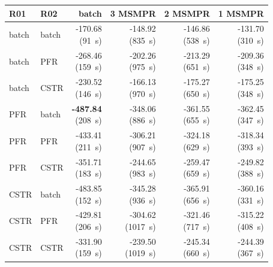 \begin{tabular}{@{}llrrrr@{}}\toprule
R01 & R02 & batch & 3 MSMPR & 2 MSMPR & 1 MSMPR\\\midrule
batch & batch & \makecell{-170.68\\(91~s)} & \makecell{-148.92\\(835~s)} & \makecell{-146.86\\(538~s)} & \makecell{-131.70\\(310~s)} \\
batch & PFR & \makecell{-268.46\\(159~s)} & \makecell{-202.26\\(975~s)} & \makecell{-213.29\\(651~s)} & \makecell{-209.36\\(348~s)} \\
batch & CSTR & \makecell{-230.52\\(146~s)} & \makecell{-166.13\\(970~s)} & \makecell{-175.27\\(650~s)} & \makecell{-175.25\\(348~s)} \\
PFR & batch & \makecell{\textbf{-487.84}\\(208~s)} & \makecell{-348.06\\(886~s)} & \makecell{-361.55\\(655~s)} & \makecell{-362.45\\(347~s)} \\
PFR & PFR & \makecell{-433.41\\(211~s)} & \makecell{-306.21\\(907~s)} & \makecell{-324.18\\(629~s)} & \makecell{-318.34\\(393~s)} \\
PFR & CSTR & \makecell{-351.71\\(183~s)} & \makecell{-244.65\\(983~s)} & \makecell{-259.47\\(659~s)} & \makecell{-249.82\\(388~s)} \\
CSTR & batch & \makecell{-483.85\\(152~s)} & \makecell{-345.28\\(936~s)} & \makecell{-365.91\\(656~s)} & \makecell{-360.16\\(331~s)} \\
CSTR & PFR & \makecell{-429.81\\(206~s)} & \makecell{-304.62\\(1017~s)} & \makecell{-321.46\\(717~s)} & \makecell{-315.22\\(408~s)} \\
CSTR & CSTR & \makecell{-331.90\\(159~s)} & \makecell{-239.50\\(1019~s)} & \makecell{-245.34\\(660~s)} & \makecell{-244.39\\(367~s)} \\
\bottomrule\end{tabular}
